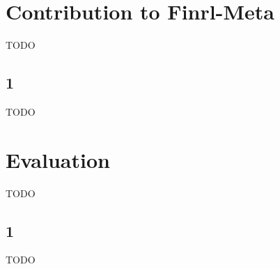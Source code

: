 

\chapter{Contribution to Finrl-Meta}
TODO


\section{1}
TODO



\chapter{Evaluation}
TODO


\section{1}
TODO
